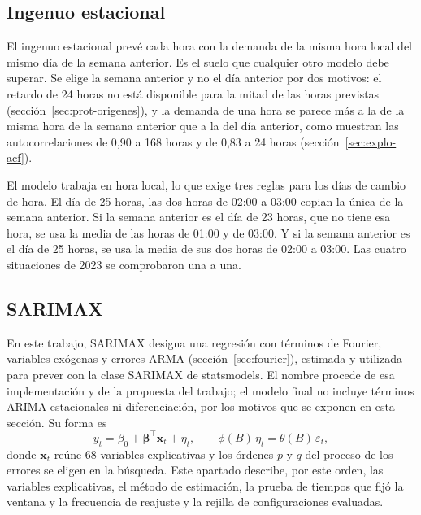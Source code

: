 \subsection{Ingenuo estacional}\label{sec:esp-ingenuo}

El ingenuo estacional prevé cada hora con la demanda de la misma hora local
del mismo día de la semana anterior. Es el suelo que cualquier otro modelo
debe superar. Se elige la semana anterior y no el día anterior por dos
motivos: el retardo de 24 horas no está disponible para la mitad de las
horas previstas (sección~\ref{sec:prot-origenes}), y la demanda de una hora
se parece más a la de la misma hora de la semana anterior que a la del día
anterior, como muestran las autocorrelaciones de 0,90 a 168 horas y de 0,83 a
24 horas (sección~\ref{sec:explo-acf}).

El modelo trabaja en hora local, lo que exige tres reglas para los días de
cambio de hora. El día de 25 horas, las dos horas de 02:00 a 03:00 copian la
única de la semana anterior. Si la semana anterior es el día de 23 horas, que
no tiene esa hora, se usa la media de las horas de 01:00 y de 03:00. Y si la
semana anterior es el día de 25 horas, se usa la media de sus dos horas de
02:00 a 03:00. Las cuatro situaciones de 2023 se comprobaron una a una.

\subsection{SARIMAX}\label{sec:esp-sarimax}

En este trabajo, SARIMAX designa una regresión con términos de Fourier,
variables exógenas y errores ARMA (sección~\ref{sec:fourier}), estimada y
utilizada para prever con la clase SARIMAX de statsmodels. El nombre procede
de esa implementación y de la propuesta del trabajo; el modelo final no
incluye términos ARIMA estacionales ni diferenciación, por los motivos que se
exponen en esta sección. Su forma es
\begin{equation}
	y_t = \beta_0 + \boldsymbol{\beta}^{\top} \mathbf{x}_t + \eta_t,
	\qquad \phi(B)\, \eta_t = \theta(B)\, \varepsilon_t,
\end{equation}
donde $\mathbf{x}_t$ reúne 68 variables explicativas y los órdenes $p$ y $q$
del proceso de los errores se eligen en la búsqueda. Este apartado describe,
por este orden, las variables explicativas, el método de estimación, la
prueba de tiempos que fijó la ventana y la frecuencia de reajuste y la
rejilla de configuraciones evaluadas.

